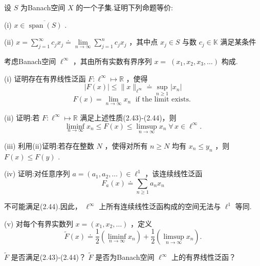 \begin{rbhw}
设 $S$ 为Banach空间 $X$ 的一个子集.证明下列命题等价:

(i) $x \in  \overline{\operatorname{span}\left( S\right) }$ .

(ii) $x = \mathop{\sum }\limits_{{j = 1}}^{\infty }{c}_{j}{x}_{j} \doteq  \mathop{\lim }\limits_{{n \rightarrow  \infty }}\mathop{\sum }\limits_{{j = 1}}^{n}{c}_{j}{x}_{j}$ ，其中点 ${x}_{j} \in  S$ 与数 ${c}_{j} \in  \mathbb{K}$ 满足某条件
\end{rbhw}

\begin{rbhw}
考虑Banach空间 ${\ell }^{\infty }$ ，其由所有实数有界序列 $x = \; \left( {{x}_{1},{x}_{2},{x}_{3},\ldots }\right)$ 构成.

(i) 证明存在有界线性泛函 $F : {\ell }^{\infty } \mapsto  \mathbb{R}$ ，使得
\begin{equation}\tag{2.43}
\left| {F\left( x\right) }\right|  \leq  \| x{\| }_{{\ell }^{\infty }} \doteq  \mathop{\sup }\limits_{{n \geq  1}}\left| {x}_{n}\right|
\end{equation}
\begin{equation}\tag{2.44}
F\left( x\right)  = \mathop{\lim }\limits_{{n \rightarrow  \infty }}{x}_{n}\;\text{ if the limit exists. }
\end{equation}

(ii) 证明:若 $F : {\ell }^{\infty } \mapsto  \mathbb{R}$ 满足上述性质(2.43)-(2.44)，则
\[
\mathop{\liminf }\limits_{{n \rightarrow  \infty }}{x}_{n} \leq  F\left( x\right)  \leq  \mathop{\limsup }\limits_{{n \rightarrow  \infty }}{x}_{n}\;\forall\,x \in  {\ell }^{\infty }.
\]

(iii) 利用(ii)证明:若存在整数 $N$ ，使得对所有 $n \geq  N$ 均有 ${x}_{n} \leq  {y}_{n}$ ，则 $F\left( x\right)  \leq  F\left( y\right)$ .

(iv) 证明:对任意序列 $a = \left( {{a}_{1},{a}_{2},\ldots }\right)  \in  {\ell }^{1}$ ，该连续线性泛函
\[
{F}_{a}\left( x\right)  \doteq  \mathop{\sum }\limits_{{n \geq  1}}{a}_{n}{x}_{n}
\]

不可能满足(2.44).因此， ${\ell }^{\infty }$ 上所有连续线性泛函构成的空间无法与 ${\ell }^{1}$ 等同.

(v) 对每个有界实数列 $x = \left( {{x}_{1},{x}_{2},\ldots }\right)$ ，定义
\[
\widetilde{F}\left( x\right)  \doteq  \frac{1}{2}\left( {\mathop{\liminf }\limits_{{n \rightarrow  \infty }}{x}_{n}}\right)  + \frac{1}{2}\left( {\mathop{\limsup }\limits_{{n \rightarrow  \infty }}{x}_{n}}\right) .
\]

$\widetilde{F}$ 是否满足(2.43)-(2.44)？ $\widetilde{F}$ 是否为Banach空间 ${\ell }^{\infty }$ 上的有界线性泛函？
\end{rbhw}

